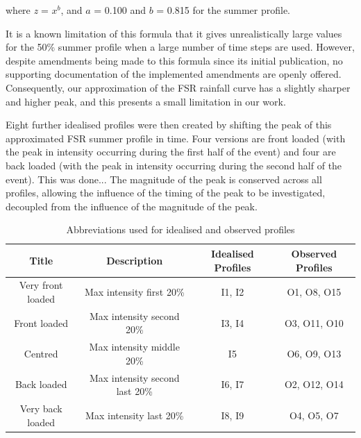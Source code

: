 \documentclass[APA,Times2COL]{WileyNJDv5}
\begin{document}
where \textit{z} = $x^b$, and $a$ = 0.100 and $b$ = 0.815 for the summer profile. 

It is a known limitation of this formula that it gives unrealistically large values for the 50\% summer profile when a large number of time steps are used. However, despite amendments being made to this formula since its initial publication, no supporting documentation of the implemented amendments are openly offered. Consequently, our approximation of the FSR rainfall curve has a slightly sharper and higher peak, and this presents a small limitation in our work. 

Eight further idealised profiles were then created by shifting the peak of this approximated FSR summer profile in time. Four versions are front loaded (with the peak in intensity occurring during the first half of the event) and four are back loaded (with the peak in intensity occurring during the second half of the event). This was done...  The magnitude of the peak is conserved across all profiles, allowing the influence of the timing of the peak to be investigated, decoupled from the influence of the magnitude of the peak. 


\begingroup
\setlength{\tabcolsep}{10pt} %
\renewcommand{\arraystretch}{1.5} %
\begin{table}[h!]
\centering
\caption{Abbreviations used for idealised and observed profiles}
\begin{tabular}{cccc} 
 \hline
 \textbf{Title} & \textbf{Description} & \textbf{Idealised Profiles} & \textbf{Observed Profiles} \\ [0.5ex] 
 \hline
 Very front loaded & Max intensity first 20\% & I1, I2 & O1, O8, O15\\
 Front loaded & Max intensity second 20\% & I3, I4 & O3, O11, O10 \\
 Centred & Max intensity middle 20\% & I5 & O6, O9, O13\\
 Back loaded & Max intensity second last 20\% & I6, I7 & O2, O12, O14\\
 Very back loaded & Max intensity last 20\% & I8, I9 & O4, O5, O7\\[1ex] 
 \hline
\end{tabular}
\label{table:profile_names}
\end{table}
\endgroup
\end{document}
